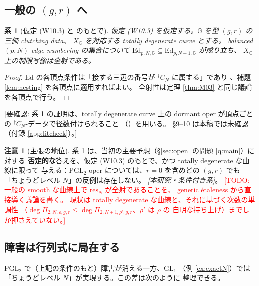 \documentclass[a4paper,11pt]{ltjsarticle}
\theoremstyle{plain}
\newtheorem{corollary}[theorem]{系}
\theoremstyle{definition}
\newtheorem{remark}[theorem]{注意}
\newcommand{\Todo}[1]{\textcolor{red}{\textsf{[TODO: #1]}}}
\newcommand{\NeedsCheck}[1]{\textcolor{blue!70!black}{\textsf{[要確認: #1]}}}
\begin{document}
\subsection{一般の $(g,r)$ へ}

\begin{corollary}[仮定 (W10.3) と {\cite[Thm.~E]{Wak2}} のもとで]\label{cor:general}
仮定 (W10.3) を仮定する。$\mathbb{G}$ を型 $(g,r)$ の三価 clutching data、
$X_{\mathbb{G}}$ を対応する totally degenerate curve とする。
balanced $(p,N)$-edge numbering の集合について
$\mathrm{Ed}_{p,N,\mathbb{G}}\subseteq\mathrm{Ed}_{p,N+1,\mathbb{G}}$ が成り立ち、
$X_{\mathbb{G}}$ 上の制限写像は全射である。
\end{corollary}

\begin{proof}
$\mathrm{Ed}$ の各頂点条件は「接する三辺の番号が ${}^{\dagger}C_N$ に属する」であり
\cite[Thm.~E]{Wak2}、補題 \ref{lem:nesting} を各頂点に適用すればよい。
全射性は定理 \ref{thm:M03} と同じ議論を各頂点で行う。
\end{proof}

\NeedsCheck{系 \ref{cor:general} の証明は、totally degenerate curve 上の
dormant oper が頂点ごとの ${}^{\dagger}C_N$-データで径数付けられること
（\cite[Thm.~E]{Wak2}）を用いる。\cite{Wak2} \S9--10 は本稿では未確認
（付録 \ref{app:litcheck}）。}

\begin{remark}[主張の地位]\label{rem:no-pgl2-cex}
系 \ref{cor:general} は、当初の主要予想（\S\ref{sec:open} の問題 \ref{q:main}）に対する
\textbf{否定的な}答えを、仮定 (W10.3) のもとで、かつ totally degenerate な曲線に限って
与える：$\mathrm{PGL}_2$-oper については、$r=0$ を含めどの $(g,r)$ でも
「ちょうどレベル $N$」の反例は存在しない。
\emph{[本研究・条件付き系]}。
\Todo{一般の smooth な曲線上で $\mathrm{res}_N$ が全射であることを、
generic étaleness \cite[Thm.~C]{Wak2} から直接導く議論を書く。
現状は totally degenerate な曲線と、それに基づく次数の単調性
（$\deg\Pi_{2,N,\rho,g,r}\le\deg\Pi_{2,N+1,\rho',g,r}$、$\rho'$ は $\rho$ の
自明な持ち上げ）までしか押さえていない。}
\end{remark}

\subsection{障害は行列式に局在する}

$\mathrm{PGL}_2$ で（上記の条件のもと）障害が消える一方、$\mathrm{GL}_1$
（例 \ref{ex:exactN}）では「ちょうどレベル $N$」が実現する。この差は次のように
整理できる。
\end{document}
